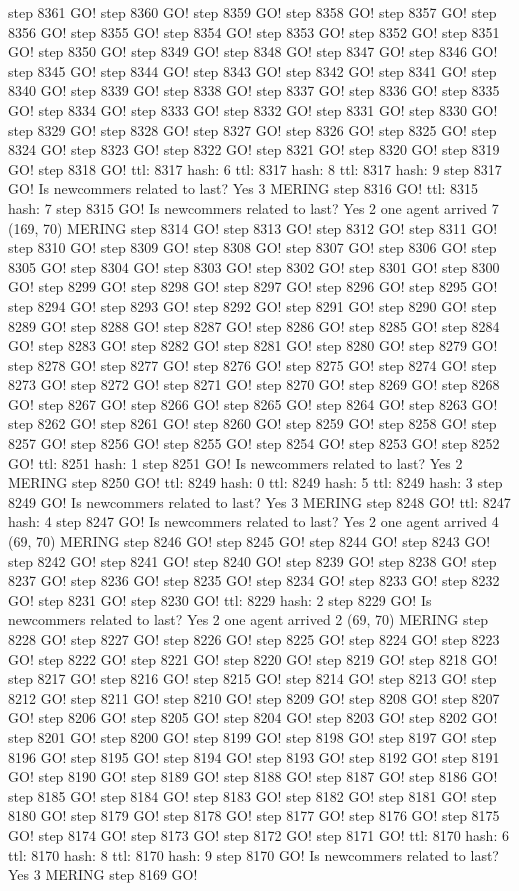 step 8361 GO! step 8360 GO! step 8359 GO! step 8358 GO! step 8357 GO! step 8356 GO! step 8355 GO! step 8354 GO! step 8353 GO! step 8352 GO! step 8351 GO! step 8350 GO! step 8349 GO! step 8348 GO! step 8347 GO! step 8346 GO! step 8345 GO! step 8344 GO! step 8343 GO! step 8342 GO! step 8341 GO! step 8340 GO! step 8339 GO! step 8338 GO! step 8337 GO! step 8336 GO! step 8335 GO! step 8334 GO! step 8333 GO! step 8332 GO! step 8331 GO! step 8330 GO! step 8329 GO! step 8328 GO! step 8327 GO! step 8326 GO! step 8325 GO! step 8324 GO! step 8323 GO! step 8322 GO! step 8321 GO! step 8320 GO! step 8319 GO! step 8318 GO! ttl: 8317 hash: 6 ttl: 8317 hash: 8 ttl: 8317 hash: 9 step 8317 GO! Is newcommers related to last? Yes 3 MERING step 8316 GO! ttl: 8315 hash: 7 step 8315 GO! Is newcommers related to last? Yes 2 one agent arrived 7 (169, 70) MERING step 8314 GO! step 8313 GO! step 8312 GO! step 8311 GO! step 8310 GO! step 8309 GO! step 8308 GO! step 8307 GO! step 8306 GO! step 8305 GO! step 8304 GO! step 8303 GO! step 8302 GO! step 8301 GO! step 8300 GO! step 8299 GO! step 8298 GO! step 8297 GO! step 8296 GO! step 8295 GO! step 8294 GO! step 8293 GO! step 8292 GO! step 8291 GO! step 8290 GO! step 8289 GO! step 8288 GO! step 8287 GO! step 8286 GO! step 8285 GO! step 8284 GO! step 8283 GO! step 8282 GO! step 8281 GO! step 8280 GO! step 8279 GO! step 8278 GO! step 8277 GO! step 8276 GO! step 8275 GO! step 8274 GO! step 8273 GO! step 8272 GO! step 8271 GO! step 8270 GO! step 8269 GO! step 8268 GO! step 8267 GO! step 8266 GO! step 8265 GO! step 8264 GO! step 8263 GO! step 8262 GO! step 8261 GO! step 8260 GO! step 8259 GO! step 8258 GO! step 8257 GO! step 8256 GO! step 8255 GO! step 8254 GO! step 8253 GO! step 8252 GO! ttl: 8251 hash: 1 step 8251 GO! Is newcommers related to last? Yes 2 MERING step 8250 GO! ttl: 8249 hash: 0 ttl: 8249 hash: 5 ttl: 8249 hash: 3 step 8249 GO! Is newcommers related to last? Yes 3 MERING step 8248 GO! ttl: 8247 hash: 4 step 8247 GO! Is newcommers related to last? Yes 2 one agent arrived 4 (69, 70) MERING step 8246 GO! step 8245 GO! step 8244 GO! step 8243 GO! step 8242 GO! step 8241 GO! step 8240 GO! step 8239 GO! step 8238 GO! step 8237 GO! step 8236 GO! step 8235 GO! step 8234 GO! step 8233 GO! step 8232 GO! step 8231 GO! step 8230 GO! ttl: 8229 hash: 2 step 8229 GO! Is newcommers related to last? Yes 2 one agent arrived 2 (69, 70) MERING step 8228 GO! step 8227 GO! step 8226 GO! step 8225 GO! step 8224 GO! step 8223 GO! step 8222 GO! step 8221 GO! step 8220 GO! step 8219 GO! step 8218 GO! step 8217 GO! step 8216 GO! step 8215 GO! step 8214 GO! step 8213 GO! step 8212 GO! step 8211 GO! step 8210 GO! step 8209 GO! step 8208 GO! step 8207 GO! step 8206 GO! step 8205 GO! step 8204 GO! step 8203 GO! step 8202 GO! step 8201 GO! step 8200 GO! step 8199 GO! step 8198 GO! step 8197 GO! step 8196 GO! step 8195 GO! step 8194 GO! step 8193 GO! step 8192 GO! step 8191 GO! step 8190 GO! step 8189 GO! step 8188 GO! step 8187 GO! step 8186 GO! step 8185 GO! step 8184 GO! step 8183 GO! step 8182 GO! step 8181 GO! step 8180 GO! step 8179 GO! step 8178 GO! step 8177 GO! step 8176 GO! step 8175 GO! step 8174 GO! step 8173 GO! step 8172 GO! step 8171 GO! ttl: 8170 hash: 6 ttl: 8170 hash: 8 ttl: 8170 hash: 9 step 8170 GO! Is newcommers related to last? Yes 3 MERING step 8169 GO! 